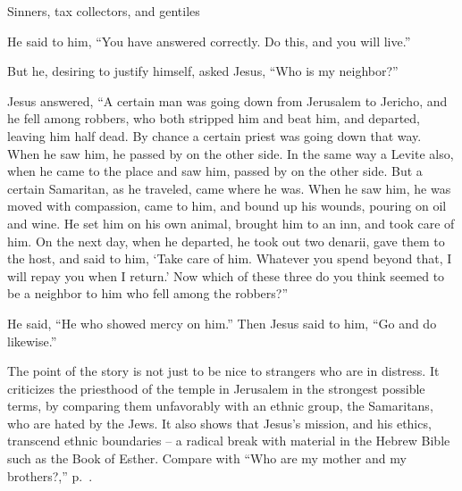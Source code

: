 \documentclass[10pt,twoside]{article} %
\newcommand{\comm}[1]{\begingroup \color{black!50} #1\endgroup}
\begin{document}
\begin{section}{Sinners, tax collectors, and gentiles}
{  He said to him, ``You have answered correctly. Do this, and you will live.''

  But he, desiring to justify himself, asked Jesus, ``Who is my neighbor?''

  Jesus answered, ``A certain man was going down from Jerusalem to Jericho, and he fell among robbers, who both stripped him and beat him, and departed, leaving him half dead.    By chance a certain priest was going down that way. When he saw him, he passed by on the other side.    In the same way a Levite also, when he came to the place and saw him, passed by on the other side.    But a certain Samaritan, as he traveled, came where he was. When he saw him, he was moved with compassion,    came to him, and bound up his wounds, pouring on oil and wine. He set him on his own animal, brought him to an inn, and took care of him.    On the next day, when he departed, he took out two denarii, gave them to the host, and said to him, `Take care of him. Whatever you spend beyond that, I will repay you when I return.'    Now which of these three do you think seemed to be a neighbor to him who fell among the robbers?''

  He said, ``He who showed mercy on him.''
Then Jesus said to him, ``Go and do likewise.'' 
}

\comm{The point of the story is not just to be nice to strangers who are in distress.
It criticizes the priesthood of the temple in Jerusalem in the strongest possible terms, by comparing them
unfavorably with an ethnic group, the Samaritans, who are hated by the Jews. It also shows that Jesus's mission,
and his ethics, transcend ethnic boundaries --  a radical break with material in the Hebrew Bible
such as the Book of Esther.
Compare with ``Who are my mother and my brothers?,'' p.~\pageref{who-are-my-mother-and-my-brothers}.}

\end{section}
\end{document}
